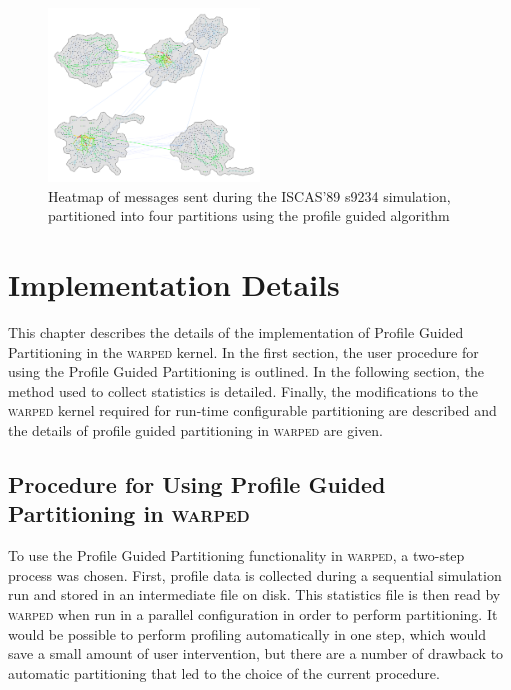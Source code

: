 \documentclass[11pt]{book}
\begin{document}
\begin{figure}[ht]\label{fig:s5378_4part}
\centering
\includegraphics[clip=true,width=0.5\textwidth]{figs/s9234_4part}
\caption{Heatmap of messages sent during the ISCAS'89 s9234 simulation, partitioned into four partitions using the profile guided algorithm}
\end{figure}

\chapter{Implementation Details}\label{implementationDetails}

This chapter describes the details of the implementation of Profile Guided Partitioning in the \textsc{warped} kernel. In the first section, the user procedure for using the Profile Guided Partitioning is outlined. In the following section, the method used to collect statistics is detailed. Finally, the modifications to the \textsc{warped} kernel required for run-time configurable partitioning are described and the details of profile guided partitioning in \textsc{warped} are given.

\section{Procedure for Using Profile Guided Partitioning in \textsc{warped}}

To use the Profile Guided Partitioning functionality in \textsc{warped}, a two-step process was chosen. First, profile data is collected during a sequential simulation run and stored in an intermediate file on disk. This statistics file is then read by \textsc{warped} when run in a parallel configuration in order to perform partitioning. It would be possible to perform profiling automatically in one step, which would save a small amount of user intervention, but there are a number of drawback to automatic partitioning that led to the choice of the current procedure.
\end{document}

